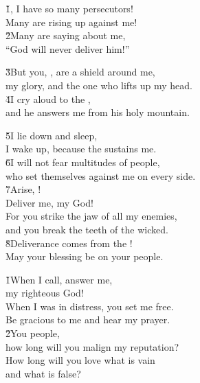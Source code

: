 \begin{poetry}
\poeml \v{1}, I have so many persecutors! \\
\poemll    Many are rising up against me! \\
\poeml \v{2}Many are saying about me, \\
\poemll    ``God will never deliver him!''
\end{poetry}

\begin{poetry}
\poeml \v{3}But you, , are a shield around me, \\
\poemll    my glory, and the one who lifts up my head. \\
\poeml \v{4}I cry aloud to the , \\
\poemll    and he answers me from his holy mountain.
\end{poetry}

\begin{poetry}
\poeml \v{5}I lie down and sleep, \\
\poemll    I wake up, because the  sustains me. \\
\poeml \v{6}I will not fear multitudes of people, \\
\poemll    who set themselves against me on every side. \\
\poeml \v{7}Arise, ! \\
\poemll    Deliver me, my God! \\
\poeml For you strike the jaw of all my enemies, \\
\poemll    and you break the teeth of the wicked. \\
\poeml \v{8}Deliverance comes from the ! \\
\poemll    May your blessing be on your people.
\end{poetry}

\begin{poetry}
\poeml \v{1}When I call, answer me, \\
\poemll    my righteous God! \\
\poeml When I was in distress, you set me free. \\
\poemll    Be gracious to me and hear my prayer. \\
\poeml \v{2}You people, \\
\poemll    how long will you malign my reputation? \\
\poeml How long will you love what is vain \\
\poemll    and what is false?
\end{poetry}

